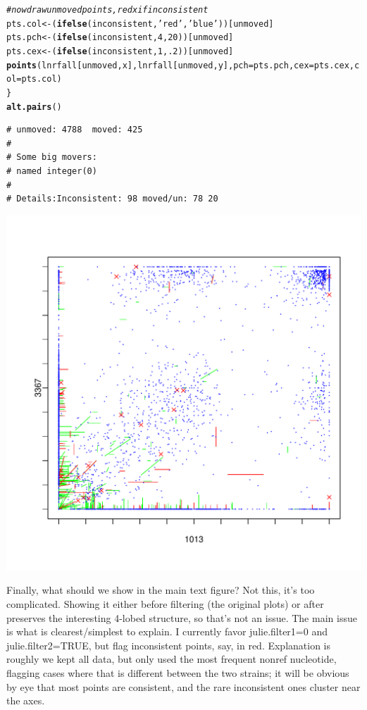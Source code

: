 \documentclass{article}\usepackage[]{graphicx}\usepackage[]{color}
\makeatletter
\newcommand{\hlnum}[1]{\textcolor[rgb]{0.686,0.059,0.569}{#1}}%
\newcommand{\hlstr}[1]{\textcolor[rgb]{0.192,0.494,0.8}{#1}}%
\newcommand{\hlcom}[1]{\textcolor[rgb]{0.678,0.584,0.686}{\textit{#1}}}%
\newcommand{\hlstd}[1]{\textcolor[rgb]{0.345,0.345,0.345}{#1}}%
\newcommand{\hlkwb}[1]{\textcolor[rgb]{0.69,0.353,0.396}{#1}}%
\newcommand{\hlkwc}[1]{\textcolor[rgb]{0.333,0.667,0.333}{#1}}%
\newcommand{\hlkwd}[1]{\textcolor[rgb]{0.737,0.353,0.396}{\textbf{#1}}}%
\newenvironment{kframe}{%
 \def\at@end@of@kframe{}%
 \ifinner\ifhmode%
  \def\at@end@of@kframe{\end{minipage}}%
  \begin{minipage}{\columnwidth}%
 \fi\fi%
 \def\FrameCommand##1{\hskip\@totalleftmargin \hskip-\fboxsep
 \colorbox{shadecolor}{##1}\hskip-\fboxsep
     \hskip-\linewidth \hskip-\@totalleftmargin \hskip\columnwidth}%
 \MakeFramed {\advance\hsize-\width
   \@totalleftmargin\z@ \linewidth\hsize
   \@setminipage}}%
 {\par\unskip\endMakeFramed%
 \at@end@of@kframe}
\newenvironment{knitrout}{}{} %
\makeatother
\begin{document}
\begin{knitrout}
\begin{kframe}
\begin{alltt}
  \hlcom{# now draw unmoved points, red x if inconsistent}
  \hlstd{pts.col} \hlkwb{<-} \hlstd{(}\hlkwd{ifelse}\hlstd{(inconsistent,}\hlstr{'red'}\hlstd{,}\hlstr{'blue'}\hlstd{))[unmoved]}
  \hlstd{pts.pch} \hlkwb{<-} \hlstd{(}\hlkwd{ifelse}\hlstd{(inconsistent,}\hlnum{4}\hlstd{,}\hlnum{20}\hlstd{))[unmoved]}
  \hlstd{pts.cex} \hlkwb{<-} \hlstd{(}\hlkwd{ifelse}\hlstd{(inconsistent,}\hlnum{1}\hlstd{,}\hlnum{.2}\hlstd{))[unmoved]}
  \hlkwd{points}\hlstd{(lnrfall[unmoved,x], lnrfall[unmoved,y],} \hlkwc{pch}\hlstd{=pts.pch,} \hlkwc{cex}\hlstd{=pts.cex,} \hlkwc{col}\hlstd{=pts.col)}
\hlstd{\}}
\hlkwd{alt.pairs}\hlstd{()}
\end{alltt}
\begin{verbatim}
# unmoved: 4788  moved: 425 
# 
# Some big movers:
# named integer(0)
# 
# Details:Inconsistent: 98 moved/un: 78 20
\end{verbatim}
\end{kframe}
\includegraphics[width=7in]{Fig1-mscat-figs/unnamed-chunk-46-1} 

\end{knitrout}

Finally, what should we show in the main text figure?  Not this, it's too complicated.  Showing it either before filtering (the original plots) or after preserves the interesting 4-lobed structure, so that's not an issue.  The main issue is what is clearest/simplest to explain.  I currently favor julie.filter1=0 and julie.filter2=TRUE, but flag inconsistent points, say, in red.  Explanation is roughly we kept all data, but only used the most frequent nonref nucleotide, flagging cases where that is different between the two strains; it will be obvious by eye that most points are consistent, and the rare inconsistent ones cluster near the axes.
\end{document}
